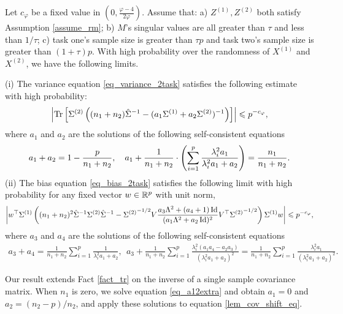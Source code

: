 \begin{theorem}\label{thm_main_RMT}
	Let $c_{\varphi}$ be a fixed value in $(0, \frac{\varphi - 4}{2\varphi})$.
	Assume that: a) $Z^{(1)}, Z^{(2)}$ both satisfy Assumption \ref{assume_rm};
	b) $M$'s singular values are all greater than $\tau$ and less than $1/\tau$;
	c) task one's sample size is greater than $\tau p$ and task two's sample size is greater than $(1 + \tau) p$.
	With high probability over the randomness of $X^{(1)}$ and $X^{(2)}$, we have the following limits.

	\noindent (i) The variance equation \eqref{eq_variance_2task} satisfies the following estimate with high probability:
			\begin{align}\label{lem_cov_shift_eq}
				\bigabs{\bigtr{\Sigma^{(2)} \bigbrace{(n_1 + n_2){\hat{\Sigma}^{-1}} - (a_1 \Sigma^{(1)} + a_2 \Sigma^{(2)})^{-1}}}} \le  p^{-c_{\varphi}}, %
			\end{align}
			where $a_1$ and $a_2$ are the solutions of the following self-consistent equations
			\begin{align}
				a_1 + a_2 = 1- \frac{p}{n_1 + n_2},\quad a_1 + \frac1{n_1 + n_2}\cdot \left({\sum_{i=1}^p \frac{\lambda_i^2 a_1}{\lambda_i^2 a_1 + a_2}}\right) = \frac{n_1}{n_1 + n_2}. \label{eq_a12extra}
			\end{align}
	\noindent (ii) The bias equation \eqref{eq_bias_2task} satisfies the following limit with high probability for any fixed vector $w\in\mathbb{R}^p$ with unit norm,
			\begin{align}\label{lem_cov_derv_eq}
				{\left| {w^{\top} \Sigma^{(1)} \left({(n_1+n_2)^2\hat{\Sigma}^{-1} \Sigma^{(2)} \hat{\Sigma}^{-1} - {\Sigma^{(2)}}^{-1/2} V {\frac{a_3 \Lambda^2 + (a_4 + 1)\operatorname{Id}}{(a_1 \Lambda^2 + a_2\operatorname{Id})^2}} V^{\top} {\Sigma^{(2)}}^{-1/2}}\right) \Sigma^{(1)} w} \right|} \leqslant  p^{-c_{\varphi}},
			\end{align}
				where $a_{3}$ and $a_4$ are the solutions of the following self-consistent equations %
			\begin{align}\label{eq_a34extra}
				a_3 + a_4 = \frac{1}{n_1 + n_2}\sum_{i=1}^p \frac{1}{\lambda_i^2 a_1 + a_2}, \ \ 
				a_3 + \frac{1}{n_1 + n_2} \sum_{i=1}^p \frac{\lambda_i^2 (a_1 a_4 - a_2 a_3)}{(\lambda_i^2 a_1 + a_2)^2} = \frac{1}{n_1 + n_2} \sum_{i=1}^p \frac{\lambda_i^2 a_1}{(\lambda_i^2 a_1 + a_2)^{2}}.
			\end{align}
\end{theorem}
Our result extends Fact \ref{fact_tr} on the inverse of a single sample covariance matrix.
When $n_1$ is zero, we solve equation \eqref{eq_a12extra} and obtain $a_1 = 0$ and $a_2 = (n_2-p) / n_2$, and apply these solutions to equation \eqref{lem_cov_shift_eq}.

